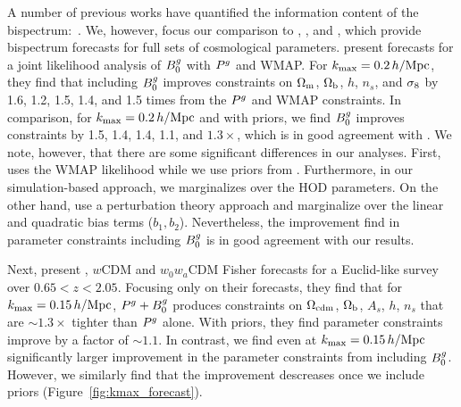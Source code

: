 A number of previous works have quantified the information content of the
bispectrum:~\citep[\eg][]{scoccimarro2004, sefusatti2006, sefusatti2007,
song2015, tellarini2016, yamauchi2017a, karagiannis2018, yankelevich2019,
chudaykin2019, coulton2019, reischke2019}. 
We, however, focus our comparison to \cite{sefusatti2006}, \cite{yankelevich2019}, 
and \cite{chudaykin2019}, which provide bispectrum forecasts for full sets of
cosmological parameters.
\cite{sefusatti2006} present \lcdm forecasts for a joint likelihood analysis of
$B^g_0$ with $P^g$ and WMAP. For $k_{\rm max} = 0.2\,h/\mathrm{Mpc}$, they find that including
$B^g_0$ improves constraints on $\Omega_{\rm m}$, $\Omega_{\rm b}$, $h$, $n_s$, and $\sigma_8$ by 1.6, 1.2,
1.5, 1.4, and 1.5 times from the $P^g$ and WMAP constraints. In comparison, for 
$k_{\rm max} = 0.2\,h/\mathrm{Mpc}$ and with \planck priors, we find $B^g_0$ improves constraints
by  1.5, 1.4, 1.4, 1.1, and $1.3\times$, which is in good agreement with
\cite{sefusatti2006}. We note, however, that there are
some significant differences in our analyses. First, \cite{sefusatti2006} uses 
the WMAP likelihood while we use priors from \planck. Furthermore, 
in our simulation-based approach, we marginalizes over the HOD parameters. On
the other hand, \cite{sefusatti2006} use a perturbation theory approach and 
marginalize over the linear and quadratic bias terms ($b_1, b_2$). 
Nevertheless, the improvement \cite{sefusatti2006} find in parameter constraints 
including $B^g_0$ is in good agreement with our results. 

Next, \cite{yankelevich2019} present \lcdm, $w$CDM and $w_0w_a$CDM Fisher
forecasts for a Euclid-like survey\cite{laureijs2011} over $0.65 < z < 2.05$.
Focusing only on their \lcdm forecasts, they find that for $k_{\rm max} = 0.15\,h/\mathrm{Mpc}$, 
$P^g+B^g_0$ produces constraints on $\Omega_{\rm cdm}$, $\Omega_{\rm b}$, $A_s$, $h$, $n_s$ 
that are ${\sim}1.3\times$ tighter than $P^g$ alone. With \planck priors, they 
find parameter constraints improve by a factor of ${\sim}1.1$. In contrast, we 
find even at $k_{\rm max}=0.15\,h/\mathrm{Mpc}$ significantly larger improvement in the parameter 
constraints from including $B^g_0$. However, we similarly find that the improvement 
descreases once we include \planck priors (Figure~\ref{fig:kmax_forecast}). 

